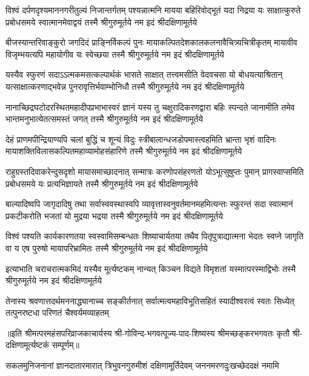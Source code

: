 

\fourlineindentedshloka
{विश्वं दर्पणदृश्यमाननगरीतुल्यं निजान्तर्गतम्}
{पश्यन्नात्मनि मायया बहिरिवोद्भूतं यदा निद्रया}
{यः साक्षात्कुरुते प्रबोधसमये स्वात्मानमेवाद्वयं}
{तस्मै श्रीगुरुमूर्तये नम इदं श्रीदक्षिणामूर्तये}

\fourlineindentedshloka
{बीजस्यान्तरिवाङ्कुरो जगदिदं प्राङ्\mbox{}निर्विकल्पं पुनः}
{मायाकल्पितदेशकालकलनावैचित्र्यचित्रीकृतम्}
{मायावीव विजृम्भयत्यपि महायोगीव यः स्वेच्छया}
{तस्मै श्रीगुरुमूर्तये नम इदं श्रीदक्षिणामूर्तये}

\fourlineindentedshloka
{यस्यैव स्फुरणं सदाऽऽत्मकमसत्कल्पार्थकं भासते}
{साक्षात् तत्त्वमसीति वेदवचसा यो बोधयत्याश्रितान्}
{यत्साक्षात्करणाद्भवेन्न पुनरावृत्तिर्भवाम्भोनिधौ}
{तस्मै श्रीगुरुमूर्तये नम इदं श्रीदक्षिणामूर्तये}

\fourlineindentedshloka
{नानाच्छिद्रघटोदरस्थितमहादीपप्रभाभास्वरं}
{ज्ञानं यस्य तु चक्षुरादिकरणद्वारा बहिः स्पन्दते}
{जानामीति तमेव भान्तमनुभात्येतत्समस्तं जगत्}
{तस्मै श्रीगुरुमूर्तये नम इदं श्रीदक्षिणामूर्तये}

\fourlineindentedshloka
{देहं प्राणमपीन्द्रियाण्यपि चलां बुद्धिं च शून्यं विदुः}
{स्त्रीबालान्धजडोपमास्त्वहमिति भ्रान्ता भृशं वादिनः}
{मायाशक्तिविलासकल्पितमहाव्यामोहसंहारिणे}
{तस्मै श्रीगुरुमूर्तये नम इदं श्रीदक्षिणामूर्तये}

\fourlineindentedshloka
{राहुग्रस्तदिवाकरेन्दुसदृशो मायासमाच्छादनात्}
{सन्मात्रः करणोपसंहरणतो योऽभूत्सुषुप्तः पुमान्}
{प्रागस्वाप्समिति प्रबोधसमये यः प्रत्यभिज्ञायते}
{तस्मै श्रीगुरुमूर्तये नम इदं श्रीदक्षिणामूर्तये}

\fourlineindentedshloka
{बाल्यादिष्वपि जागृदादिषु तथा सर्वास्ववस्थास्वपि}
{व्यावृत्तास्वनुवर्तमानमहमित्यन्तः स्फुरन्तं सदा}
{स्वात्मानं प्रकटीकरोति भजतां यो मुद्रया भद्रया}
{तस्मै श्रीगुरुमूर्तये नम इदं श्रीदक्षिणामूर्तये}

\fourlineindentedshloka
{विश्वं पश्यति कार्यकारणतया स्वस्वामिसम्बन्धतः}
{शिष्याचार्यतया तथैव पितृपुत्राद्यात्मना भेदतः}
{स्वप्ने जागृति वा य एष पुरुषो मायापरिभ्रामितः}
{तस्मै श्रीगुरुमूर्तये नम इदं श्रीदक्षिणामूर्तये}

{इत्याभाति चराचरात्मकमिदं यस्यैव मूर्त्यष्टकम्}
{नान्यत् किञ्चन विद्यते विमृशतां यस्मात्परस्माद्विभोः}
{तस्मै श्रीगुरुमूर्तये नम इदं श्रीदक्षिणामूर्तये}

{तेनास्य श्रवणात्तदर्थमननाद्ध्यानाच्च सङ्कीर्तनात्}
{सर्वात्मत्वमहाविभूतिसहितं स्यादीश्वरत्वं स्वतः}
{सिध्येत् तत्पुनरष्टधा परिणतं चैश्वर्यमव्याहतम्}

॥इति श्रीमत्परमहंसपरिव्राजकाचार्यस्य श्री-गोविन्द-भगवत्पूज्य-पाद-शिष्यस्य 
श्रीमच्छङ्करभगवतः कृतौ श्री-दक्षिणामूर्त्यष्टकं सम्पूर्णम्॥

\closesection
{}
{सकलमुनिजनानां ज्ञानदातारमारात्}
{त्रिभुवनगुरुमीशं दक्षिणामूर्तिदेवम्}
{जननमरणदुःखच्छेददक्षं नमामि}